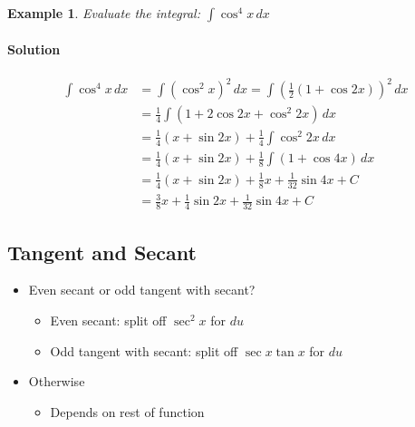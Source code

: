 \documentclass[letterpaper, 11pt, openany]{book}
\theoremstyle{mytheoremstyle}
\theoremstyle{myexamplestyle}
\newtheorem{example}{Example}[section]
\newenvironment{solution}{\paragraph{\sffamily \smaller \fontseries{b}\selectfont Solution}}{\hfill\faSquare}
\begin{document}
\begin{example}\label{e:trigint-cos4}
    Evaluate the integral: $\displaystyle \int \cos^{4} x\, dx$
    
    \begin{solution}
        \begin{align*}
            \int \cos^{4} x\, dx    &= \int \left( \cos^{2} x \right)^{2} \, dx = \int \left( \tfrac{1}{2}\left( 1 + \cos 2x \right) \right)^{2} \, dx \\
                                    &= \frac{1}{4}\int \left( 1 + 2\cos 2x + \cos^{2} 2x \right)\, dx \\
                                    &= \frac{1}{4}\left( x + \sin 2x \right) + \frac{1}{4} \int \cos^{2}2x \, dx\\
                                    &= \frac{1}{4}\left( x + \sin 2x \right) + \frac{1}{8} \int \left( 1 + \cos 4x \right)\, dx \\
                                    &= \frac{1}{4}\left( x + \sin 2x \right) + \frac{1}{8} x + \frac{1}{32}\sin 4x + C\\
                                    &= \frac{3}{8}x + \frac{1}{4}\sin 2x + \frac{1}{32}\sin 4x + C
        \end{align*}
    \end{solution}
\end{example}

\subsection{Tangent and Secant}
\begin{itemize}
    \item Even secant or odd tangent with secant? \faSmile
    \begin{itemize}
        \item Even secant: split off $\sec^{2}x$ for $du$
        \item Odd tangent with secant: split off $\sec x \tan x$ for $du$
    \end{itemize}
    \item Otherwise \faMeh
    \begin{itemize}
        \item Depends on rest of function
    \end{itemize}    
\end{itemize}
\end{document}
